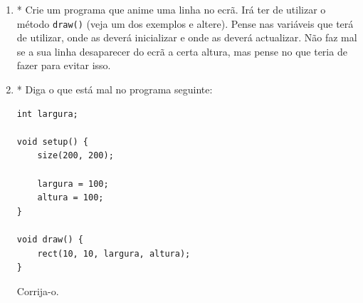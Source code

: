 \begin{enumerate}
\item  \label{exe:3_2} \label{ps:linhaAnimada}
* Crie um programa que anime uma linha no ecrã. Irá ter de utilizar o método \texttt{draw()} (veja um dos exemplos e altere).
Pense nas variáveis que terá de utilizar, onde as deverá inicializar e onde as deverá actualizar. Não faz mal se a sua linha desaparecer do ecrã a certa altura, mas pense no que teria de fazer para evitar isso.

\item  \label{exe:3_3}
* Diga o que está mal no programa seguinte:
\begin{lstlisting}
int largura;

void setup() {
    size(200, 200);
    
    largura = 100;
    altura = 100;
}

void draw() {
    rect(10, 10, largura, altura);
}
\end{lstlisting}
Corrija-o.
\end{enumerate}